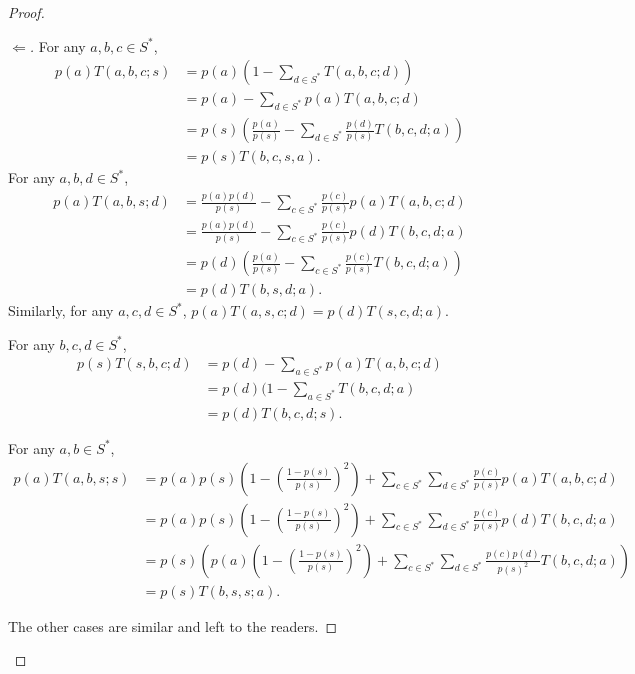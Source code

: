 \documentclass[10pt]{amsart}
\theoremstyle{definition}\newtheorem{defi}[theo]{Definition}\newtheorem{rema}[theo]{Remark}\newtheorem{exam}[theo]{Example}\newtheorem{exem}[theo]{Example}\newtheorem{nota}[theo]{Notation}
\newcounter{a}
\begin{document}
\begin{proof}
\begin{proof}[$\Leftarrow$]
For any $a,b,c \in S^*$,
\begin{align*}
p(a) T(a,b,c;s) & = p(a) \left(1 - \sum_{d \in S^*} T(a,b,c;d) \right)\\
& = p(a) - \sum_{d\in S^*} p(a) T(a,b,c;d) \\
& = p(s) \left(\frac{p(a)}{p(s)} - \sum_{d \in S^*} \frac{p(d)}{p(s)} T(b,c,d;a) \right) \\
& = p(s) T(b,c,s,a).
\end{align*}
For any $a,b,d \in S^*$,
\begin{align*}
p(a) T(a,b,s;d) & = \frac{p(a)p(d)}{p(s)} - \sum_{c \in S^*} \frac{p(c)}{p(s)} p(a) T(a,b,c;d) \\
& = \frac{p(a)p(d)}{p(s)} - \sum_{c \in S^*} \frac{p(c)}{p(s)} p(d) T(b,c,d;a) \\
& = p(d) \left(\frac{p(a)}{p(s)} - \sum_{c \in S^*} \frac{p(c)}{p(s)} T(b,c,d;a) \right) \\
& = p(d) T(b,s,d;a).
\end{align*}
Similarly, for any $a,c,d \in S^*$, $p(a) T(a,s,c;d) = p(d) T(s,c,d;a)$.

For any $b,c,d \in S^*$,
\begin{align*}
p(s) T(s,b,c;d) & = p(d) - \sum_{a\in S^*} p(a) T(a,b,c;d)\\
& = p(d) (1 - \sum_{a \in S^*} T(b,c,d;a) \\
& = p(d) T(b,c,d;s).
\end{align*}

For any $a,b \in S^*$,
\begin{align*}
p(a) T(a,b,s;s) & = p(a) p(s) \left(1 - \left(\frac{1-p(s)}{p(s)}\right)^2 \right) + \sum_{c \in S^*} \sum_{d \in S^*} \frac{p(c)}{p(s)} p(a) T(a,b,c;d)\\
& = p(a) p(s) \left(1 - \left(\frac{1-p(s)}{p(s)}\right)^2 \right) + \sum_{c \in S^*} \sum_{d \in S^*} \frac{p(c)}{p(s)} p(d) T(b,c,d;a)\\
& = p(s) \left(p(a) \left(1 - \left(\frac{1-p(s)}{p(s)}\right)^2 \right) + \sum_{c \in S^*} \sum_{d \in S^*} \frac{p(c)p(d)}{p(s)^2} T(b,c,d;a) \right)\\
& = p(s) T(b,s,s;a).
\end{align*}

The other cases are similar and left to the readers.
\end{proof}
\let\qed\relax
\end{proof}
\end{document}
